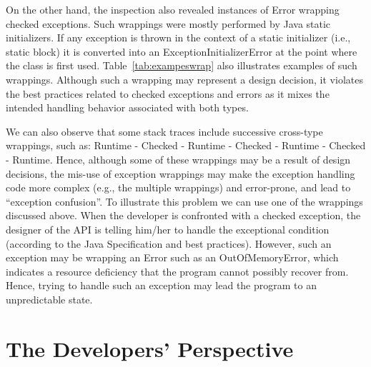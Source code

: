On the other hand, the inspection 
also revealed instances of Error wrapping checked exceptions. Such wrappings were 
mostly performed by Java static initializers. If any exception is thrown in the context of a static initializer 
(i.e., static block)  it is converted into an ExceptionInitializerError 
at the point where the class is first used.  Table~\ref{tab:exampeswrap} also illustrates
examples of such wrappings. Although such a wrapping may represent a design decision,
it violates the best practices related to checked exceptions and errors as it mixes the intended handling 
behavior associated with both types.

We can also observe that some stack traces include successive cross-type wrappings, 
such as: Runtime - Checked - Runtime - Checked - Runtime - Checked -
Runtime. 
Hence, although some of these wrappings may be a result of design decisions, the mis-use of exception wrappings may make the exception handling 
code more complex (e.g., the multiple wrappings) and error-prone,
 and lead to ``exception confusion''. To illustrate this problem we can use one of the wrappings discussed above.
When the developer is confronted with a checked exception, the designer of the API is telling him/her 
to handle the exceptional condition (according to the Java Specification and 
best practices). However, such an exception may be wrapping an Error such
as an OutOfMemoryError, which indicates a resource deficiency 
that the program cannot possibly recover from. Hence, trying to
handle such an exception  
may lead the program to an unpredictable state.

\bigskip


\bigskip

\section{The Developers' Perspective}
\label{sec:dev}


